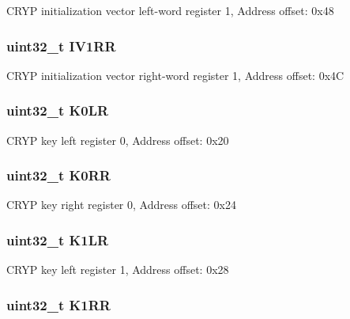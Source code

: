 C\-R\-Y\-P initialization vector left-\/word register 1, Address offset\-: 0x48 \hypertarget{struct_c_r_y_p___type_def_a38a9f05c03174023fc6ac951c04eaeff}{
\subsubsection[{I\-V1\-R\-R}]{ uint32\-\_\-t I\-V1\-R\-R}}\label{struct_c_r_y_p___type_def_a38a9f05c03174023fc6ac951c04eaeff}
C\-R\-Y\-P initialization vector right-\/word register 1, Address offset\-: 0x4\-C \hypertarget{struct_c_r_y_p___type_def_a3ca109e86323625e5f56f92f999c3b05}{
\subsubsection[{K0\-L\-R}]{ uint32\-\_\-t K0\-L\-R}}\label{struct_c_r_y_p___type_def_a3ca109e86323625e5f56f92f999c3b05}
C\-R\-Y\-P key left register 0, Address offset\-: 0x20 \hypertarget{struct_c_r_y_p___type_def_ae6d97d339f0091d4a105001ea59086ae}{
\subsubsection[{K0\-R\-R}]{ uint32\-\_\-t K0\-R\-R}}\label{struct_c_r_y_p___type_def_ae6d97d339f0091d4a105001ea59086ae}
C\-R\-Y\-P key right register 0, Address offset\-: 0x24 \hypertarget{struct_c_r_y_p___type_def_a948ff2e2e97978287411fe725dd70a7f}{
\subsubsection[{K1\-L\-R}]{ uint32\-\_\-t K1\-L\-R}}\label{struct_c_r_y_p___type_def_a948ff2e2e97978287411fe725dd70a7f}
C\-R\-Y\-P key left register 1, Address offset\-: 0x28 \hypertarget{struct_c_r_y_p___type_def_a7554383cff84540eb260a3fdf55cb934}{
\subsubsection[{K1\-R\-R}]{ uint32\-\_\-t K1\-R\-R}}\label{struct_c_r_y_p___type_def_a7554383cff84540eb260a3fdf55cb934}
